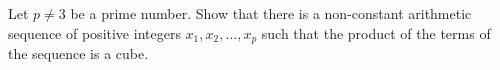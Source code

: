 Let $p\neq 3$ be a prime number. Show that there is a non-constant arithmetic sequence of positive integers $x_1,x_2,\ldots ,x_p$ such that the product of the terms of the sequence is a cube.
